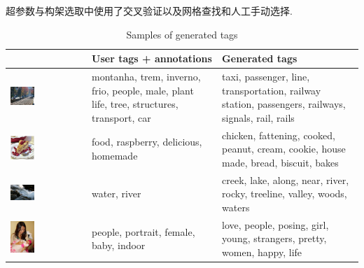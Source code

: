 \documentclass{article} %
\begin{document}
超参数与构架选取中使用了交叉验证以及网格查找和人工手动选择.

\begin{table}[h]
\begin{tabular} {l | b{3.7cm} | b{3.7cm}}
  & User tags + annotations & Generated tags \\
 \hline
 \includegraphics[width=0.33\textwidth, height=0.12\textheight]{track.jpg} & montanha, trem, inverno, frio, people, male, plant life, tree, structures, transport, car & taxi, passenger, line, transportation, railway station, passengers, railways, signals, rail, rails \\
 \includegraphics[width=0.33\textwidth, height=0.12\textheight]{cake.jpg} & food, raspberry, delicious, homemade & chicken, fattening, cooked, peanut, cream, cookie, house made, bread, biscuit, bakes \\

 \includegraphics[width=0.33\textwidth, height=0.12\textheight]{river.jpg} & water, river & creek, lake, along, near, river, rocky, treeline, valley, woods, waters \\

 \includegraphics[width=0.33\textwidth, height=0.12\textheight]{baby.jpg} & people, portrait, female, baby, indoor & love, people, posing, girl, young, strangers, pretty, women, happy, life \\
\end{tabular}
\label{table:samples}
\caption{Samples of generated tags}
\end{table}
\end{document}

